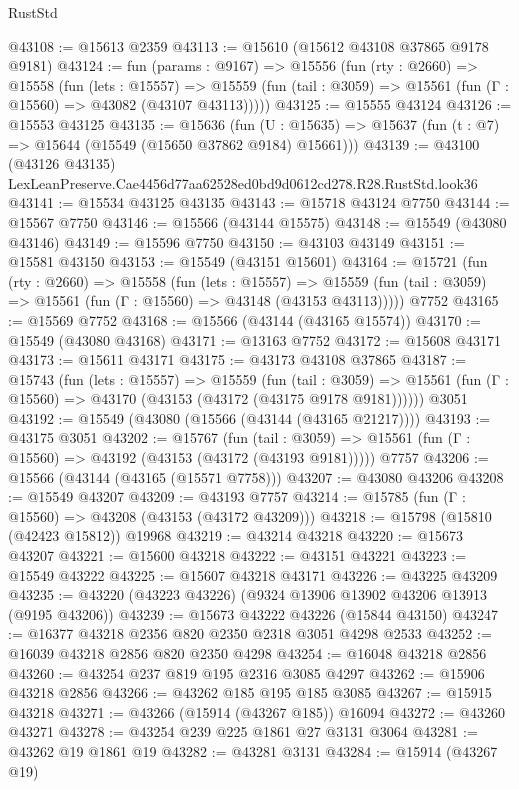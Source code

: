 \begin{lexlean}{RustStd}
\begin{coremodule}
@43108 := @15613 @2359
@43113 := @15610 (@15612 @43108 @37865 @9178 @9181)
@43124 := fun (params : @9167) =>
  @15556
    (fun (rty : @2660) =>
    @15558
      (fun (lets : @15557) =>
      @15559 (fun (tail : @3059) => @15561 (fun (Γ : @15560) => @43082 (@43107 @43113)))))
@43125 := @15555 @43124
@43126 := @15553 @43125
@43135 := @15636
    (fun (U : @15635) => @15637 (fun (t : @7) => @15644 (@15549 (@15650 @37862 @9184) @15661)))
@43139 := @43100
    (@43126 @43135)
    LexLeanPreserve.Cae4456d77aa62528ed0bd9d0612cd278.R28.RustStd.look36
@43141 := @15534 @43125 @43135
@43143 := @15718 @43124 @7750
@43144 := @15567 @7750
@43146 := @15566 (@43144 @15575)
@43148 := @15549 (@43080 @43146)
@43149 := @15596 @7750
@43150 := @43103 @43149
@43151 := @15581 @43150
@43153 := @15549 (@43151 @15601)
@43164 := @15721
    (fun (rty : @2660) =>
    @15558
      (fun (lets : @15557) =>
      @15559 (fun (tail : @3059) => @15561 (fun (Γ : @15560) => @43148 (@43153 @43113)))))
    @7752
@43165 := @15569 @7752
@43168 := @15566 (@43144 (@43165 @15574))
@43170 := @15549 (@43080 @43168)
@43171 := @13163 @7752
@43172 := @15608 @43171
@43173 := @15611 @43171
@43175 := @43173 @43108 @37865
@43187 := @15743
    (fun (lets : @15557) =>
    @15559
      (fun (tail : @3059) =>
      @15561 (fun (Γ : @15560) => @43170 (@43153 (@43172 (@43175 @9178 @9181))))))
    @3051
@43192 := @15549 (@43080 (@15566 (@43144 (@43165 @21217))))
@43193 := @43175 @3051
@43202 := @15767
    (fun (tail : @3059) => @15561 (fun (Γ : @15560) => @43192 (@43153 (@43172 (@43193 @9181)))))
    @7757
@43206 := @15566 (@43144 (@43165 (@15571 @7758)))
@43207 := @43080 @43206
@43208 := @15549 @43207
@43209 := @43193 @7757
@43214 := @15785 (fun (Γ : @15560) => @43208 (@43153 (@43172 @43209)))
@43218 := @15798 (@15810 (@42423 @15812)) @19968
@43219 := @43214 @43218
@43220 := @15673 @43207
@43221 := @15600 @43218
@43222 := @43151 @43221
@43223 := @15549 @43222
@43225 := @15607 @43218 @43171
@43226 := @43225 @43209
@43235 := @43220 (@43223 @43226) (@9324 @13906 @13902 @43206 @13913 (@9195 @43206))
@43239 := @15673 @43222 @43226 (@15844 @43150)
@43247 := @16377 @43218 @2356 @820 @2350 @2318 @3051 @4298 @2533
@43252 := @16039 @43218 @2856 @820 @2350 @4298
@43254 := @16048 @43218 @2856
@43260 := @43254 @237 @819 @195 @2316 @3085 @4297
@43262 := @15906 @43218 @2856
@43266 := @43262 @185 @195 @185 @3085
@43267 := @15915 @43218
@43271 := @43266 (@15914 (@43267 @185)) @16094
@43272 := @43260 @43271
@43278 := @43254 @239 @225 @1861 @27 @3131 @3064
@43281 := @43262 @19 @1861 @19
@43282 := @43281 @3131
@43284 := @15914 (@43267 @19)

\end{coremodule}
\end{lexlean}
